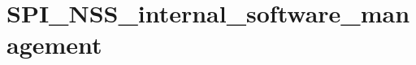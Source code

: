 \hypertarget{group___s_p_i___n_s_s__internal__software__management}{\section{S\-P\-I\-\_\-\-N\-S\-S\-\_\-internal\-\_\-software\-\_\-management}
\label{group___s_p_i___n_s_s__internal__software__management}
}
